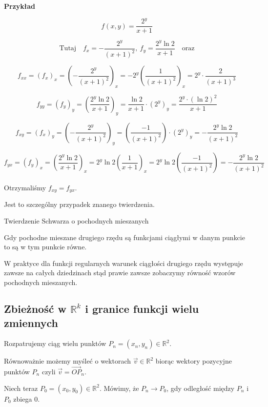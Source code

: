 \textbf{Przykład}

$$ f(x,y) = \frac{2^y}{x+1} $$

$$ \textrm{Tutaj} \quad  f_x = -\frac{2^y}{(x+1)^2}, \ f_y = \frac{2^y \ln 2}{x+1} \quad \textrm{oraz} $$

$$ f_{xx} = (f_x)_x = \left( - \frac{2^y}{(x+1)^2} \right)_x = -2^y \left( \frac{1}{(x+1)^2} \right)_x = 2^y \cdot \frac{2}{(x+1)^3} $$

$$ f_{yy} = (f_y)_y = \left( \frac{2^y \ln 2}{x+1} \right)_y = \frac{\ln2}{x+1} \cdot (2^y)_y = \frac{2^y \cdot (\ln2)^2}{x+1} $$

$$ f_{xy} = (f_x)_y = \left( - \frac{2^y}{(x+1)^2} \right)_y = \left( \frac{-1}{(x+1)^2} \right) \cdot (2^y)_y = - \frac{2^y \ln2}{(x+1)^2} $$

$$ f_{yx} = (f_y)_x = \left( \frac{2^y \ln2}{x+1} \right)_x = 2^y \ln2 \left( \frac{1}{x+1} \right)_x = 2^y \ln2 \left( \frac{-1}{(x+1)^2} \right) = - \frac{2^y \ln2}{(x+1)^2} $$ \\

Otrzymaliśmy $ f_{xy} = f_{yx} $.

Jest to szczególny przypadek znanego twierdzenia. \\

\begin{tw}{Twierdzenie Schwarza o pochodnych mieszanych}

Gdy pochodne mieszane drugiego rzędu są funkcjami ciągłymi w danym punkcie to są w tym punkcie równe.

W praktyce dla funkcji regularnych warunek ciągłości drugiego rzędu występuje zawsze na całych dziedzinach
stąd prawie zawsze zobaczymy równość wzorów pochodnych mieszanych.
\end{tw}

\subsection*{Zbieżność w $\mathbb{R}^k$ i granice funkcji wielu zmiennych}

Rozpatrujemy ciąg wielu punktów $ P_n = (x_n, y_n) \in \mathbb{R}^2 $.

Równoważnie możemy myśleć o wektorach $ \vec{v} \in \mathbb{R}^2 $ biorąc wektory pozycyjne punktów $P_n$ czyli $\vec{v} = \vec{OP}_n$.

Niech teraz $ P_0 = (x_0, y_0) \in \mathbb{R}^2 $. Mówimy, że $ P_n \to P_0 $, gdy odległość między $P_n$ i $P_0$ zbiega $0$.

